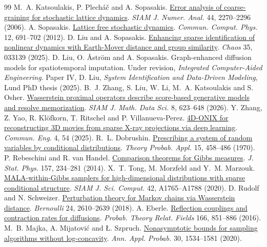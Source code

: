 \documentclass[12pt,a4paper]{article}
\begin{document}
\begin{thebibliography}{99}
\setlength{\itemsep}{0pt}\setlength{\parskip}{0pt}
 M.~A. Katsoulakis, P. Plech\'a\v{c} and A. Sopasakis. \href{https://doi.org/10.1137/050637339}{Error analysis of coarse-graining for stochastic lattice dynamics}. \emph{SIAM J. Numer. Anal.} 44, 2270--2296 (2006).
 A. Sopasakis. \href{https://doi.org/10.4208/cicp.110211.200611a}{Lattice free stochastic dynamics}. \emph{Commun. Comput. Phys.} 12, 691--702 (2012).
 D. Liu and A. Sopasakis. \href{https://doi.org/10.1063/5.0214404}{Enhancing sparse identification of nonlinear dynamics with Earth-Mover distance and group similarity}. \emph{Chaos} 35, 033139 (2025).
 D. Liu, O. \AA{}str\"om and A. Sopasakis. Graph-enhanced diffusion models for spatiotemporal imputation. Under revision, \emph{Integrated Computer-Aided Engineering}. Paper IV, D. Liu, \emph{System Identification and Data-Driven Modeling}, Lund PhD thesis (2025).
 B.~J. Zhang, S. Liu, W. Li, M.~A. Katsoulakis and S. Osher. \href{https://doi.org/10.1137/24M1644584}{Wasserstein proximal operators describe score-based generative models and resolve memorization}. \emph{SIAM J. Math. Data Sci.} 8, 623--648 (2026).
 Y. Zhang, Z. Yao, R. Kl\"ofkorn, T. Ritschel and P. Villanueva-Perez. \href{https://doi.org/10.1038/s44172-025-00390-w}{4D-ONIX for reconstructing 3D movies from sparse X-ray projections via deep learning}. \emph{Commun. Eng.} 4, 54 (2025).
 R.~L. Dobrushin. \href{https://doi.org/10.1137/1115049}{Prescribing a system of random variables by conditional distributions}. \emph{Theory Probab. Appl.} 15, 458--486 (1970).
 P. Rebeschini and R. van Handel. \href{https://doi.org/10.1007/s10955-014-1087-7}{Comparison theorems for Gibbs measures}. \emph{J. Stat. Phys.} 157, 234--281 (2014).
 X.~T. Tong, M. Morzfeld and Y.~M. Marzouk. \href{https://doi.org/10.1137/19M1284014}{MALA-within-Gibbs samplers for high-dimensional distributions with sparse conditional structure}. \emph{SIAM J. Sci. Comput.} 42, A1765--A1788 (2020).
 D. Rudolf and N. Schweizer. \href{https://doi.org/10.3150/17-BEJ938}{Perturbation theory for Markov chains via Wasserstein distance}. \emph{Bernoulli} 24, 2610--2639 (2018).
 A. Eberle. \href{https://doi.org/10.1007/s00440-015-0673-1}{Reflection couplings and contraction rates for diffusions}. \emph{Probab. Theory Relat. Fields} 166, 851--886 (2016).
 M.~B. Majka, A. Mijatovi\'c and \L. Szpruch. \href{https://doi.org/10.1214/19-AAP1535}{Nonasymptotic bounds for sampling algorithms without log-concavity}. \emph{Ann. Appl. Probab.} 30, 1534--1581 (2020).

\end{thebibliography}
\end{document}
